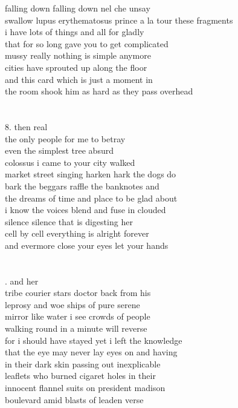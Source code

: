 \documentclass{article}
\begin{document}
falling down falling down nel che unsay\\
swallow lupus erythematosus prince a la tour these fragments\\
i have lots of things and all for gladly\\
that for so long gave you to get complicated\\
mussy really nothing is simple anymore\\
cities have sprouted up along the floor\\
and this card which is just a moment in\\
the room shook him as hard as they pass overhead\\
\\
\\
8. then real\\
the only people for me to betray\\
even the simplest tree absurd\\
colossus i came to your city walked\\
market street singing harken hark the dogs do\\
bark the beggars raffle the banknotes and\\
the dreams of time and place to be glad about\\
i know the voices blend and fuse in clouded\\
silence silence that is digesting her\\
cell by cell everything is alright forever\\
and evermore close your eyes let your hands\\
\\
\\
\newpage
{}. and her\\
tribe courier stars doctor back from his\\
leprosy and woe ships of pure serene\\
mirror like water i see crowds of people\\
walking round in a minute will reverse\\
for i should have stayed yet i left the knowledge\\
that the eye may never lay eyes on and having\\
in their dark skin passing out inexplicable\\
leaflets who burned cigaret holes in their\\
innocent flannel suits on president madison\\
boulevard amid blasts of leaden verse\\
\end{document}
